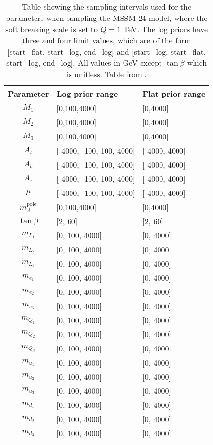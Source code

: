 \documentclass[twoside,english]{uiofysmaster}
\begin{document}
\begin{table}
\centering
\begin{tabular}{@{}cll@{}} \toprule
Parameter & Log prior range & Flat prior range\\ \midrule
$M_1$ & [0,100,4000] & [0,4000]\\
$M_2$ & [0,100,4000] & [0,4000]\\
$M_3$ & [0,100,4000] & [0,4000]\\
$A_t$ & [-4000, -100, 100, 4000] & [-4000, 4000]\\
$A_b$ & [-4000, -100, 100, 4000] & [-4000, 4000]\\
$A_{\tau}$ & [-4000, -100, 100, 4000] & [-4000, 4000]\\
$\mu$ & [-4000, -100, 100, 4000] & [-4000, 4000]\\
$m_A^{\text{pole}}$ & [0,100,4000] & [0,4000]\\
$\tan \beta$ & [2, 60] & [2, 60]\\
$m_{L_1}$ & [0, 100, 4000] & [0, 4000]\\
$m_{L_2}$ & [0, 100, 4000] & [0, 4000]\\
$m_{L_3}$ & [0, 100, 4000] & [0, 4000]\\
$m_{e_1}$ & [0, 100, 4000] & [0, 4000]\\
$m_{e_2}$ & [0, 100, 4000] & [0, 4000]\\
$m_{e_3}$ & [0, 100, 4000] & [0, 4000]\\
$m_{Q_1}$ & [0, 100, 4000] & [0, 4000]\\
$m_{Q_2}$ & [0, 100, 4000] & [0, 4000]\\
$m_{Q_3}$ & [0, 100, 4000] & [0, 4000]\\
$m_{u_1}$ & [0, 100, 4000] & [0, 4000]\\
$m_{u_2}$ & [0, 100, 4000] & [0, 4000]\\
$m_{u_3}$ & [0, 100, 4000] & [0, 4000]\\
$m_{d_1}$ & [0, 100, 4000] & [0, 4000]\\
$m_{d_2}$ & [0, 100, 4000] & [0, 4000]\\
$m_{d_3}$ & [0, 100, 4000] & [0, 4000]\\ \bottomrule
\end{tabular}
\caption{Table showing the sampling intervals used for the parameters when sampling the MSSM-24 model, where the soft breaking scale is set to $Q = 1$ TeV. The log priors have three and four limit values, which are of the form [start\_flat, start\_log, end\_log] and [start\_log, start\_flat, start\_log, end\_log]. All values in GeV except $\tan \beta$ which is unitless. Table from \cite{sparre2018fast}.}
\label{Tab:: evalualting cross : Feature distributions }
\end{table}
\end{document}
